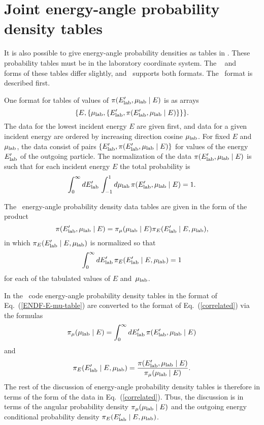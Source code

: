 \chapter{Joint energy-angle probability density tables}
\label{Sec:joint-table}
It is also possible to give energy-angle probability densities
as tables in \xendl.  These probability tables must be in the 
laboratory coordinate system.
The \ENDL~\cite{Omega} and \ENDF~\cite{ENDFB} forms of these
tables differ slightly, and \gettransfer\ supports both formats.
The \ENDF\ format is described first.

One format for tables
of values of $\pi(E_{\text{lab}}', \mu_{\text{lab}} \mid E)$ is as arrays
\begin{equation}
  \{ E, \{ \mu_{\text{lab}}, \{ E_{\text{lab}}', \pi(E_{\text{lab}}', \mu_{\text{lab}} \mid E) \} \} \}.
 \label{ENDF-E-mu-table}
\end{equation}
The data for the lowest incident energy $E$ are given first,
and data for a given incident energy are ordered by increasing direction cosine $\mu_{\text{lab}}$.
For fixed $E$ and $\mu_{\text{lab}}$, the data consist of pairs $\{ E_{\text{lab}}', \pi(E_{\text{lab}}', \mu_{\text{lab}} \mid E) \}$
for values of the energy $E_{\text{lab}}'$ of the outgoing particle.
The normalization of the data $\pi(E_{\text{lab}}', \mu_{\text{lab}} \mid E)$ is such that 
for each incident energy $E$
the total probability is
$$
  \int_0^\infty dE_{\text{lab}}' \, \int_{-1}^1 d\mu_{\text{lab}} \, \pi(E_{\text{lab}}', \mu_{\text{lab}} \mid E) = 1.
$$

The \ENDL\ energy-angle probability density data tables
are given in the form of the product
\begin{equation}
  \pi(E_{\text{lab}}', \mu_{\text{lab}} \mid E) =
  \pi_\mu(\mu_{\text{lab}} \mid E)\pi_E(E_{\text{lab}}' \mid E, \mu_{\text{lab}}),
   \label{correlated}
\end{equation}
in which $\pi_E(E_{\text{lab}}' \mid E, \mu_{\text{lab}})$ is normalized so that
$$
  \int_0^\infty dE_{\text{lab}}' \, \pi_E(E_{\text{lab}}' \mid E, \mu_{\text{lab}}) = 1
$$
for each of the tabulated values of $E$ and~$\mu_{\text{lab}}$.

In the \gettransfer\ code energy-angle probability density
tables in the format of Eq.~(\ref{ENDF-E-mu-table}) are converted to
the format of Eq.~(\ref{correlated}) via the formulas
$$
  \pi_\mu(\mu_{\text{lab}} \mid E) = \int_0^\infty dE_{\text{lab}}' \, \pi(E_{\text{lab}}', \mu_{\text{lab}} \mid E)
$$
and
$$
  \pi_E(E_{\text{lab}}' \mid E, \mu_{\text{lab}}) = \frac
    {\pi(E_{\text{lab}}', \mu_{\text{lab}} \mid E)} {\pi_\mu(\mu_{\text{lab}} \mid E)}.
$$
The rest of the discussion of energy-angle probability density
tables is therefore in terms of the form of the data in Eq.~(\ref{correlated}).
Tbus, the discussion is in terms of the angular probability density $\pi_\mu(\mu_{\text{lab}} \mid E)$
and the outgoing energy conditional probability density $\pi_E(E_{\text{lab}}' \mid E, \mu_{\text{lab}})$.

